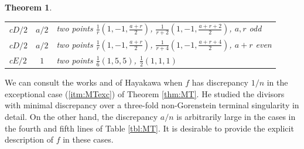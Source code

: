 \documentclass[a4paper,11pt]{amsart}
\newtheorem{theorem}{Theorem}[section]
\theoremstyle{definition}
\theoremstyle{remark}
\numberwithin{equation}{section}
\begin{document}
\begin{theorem}
\begin{enumerate}
\begin{table}[ht]
\begin{tabular}{l|c|l}
\textup{c$D/2$}  & $a/2$ &
\textup{two points $\frac{1}{r}(1,-1,\frac{a+r}{2})$,
$\frac{1}{r+2}(1,-1,\frac{a+r+2}{2})$,
$a,r$ odd} \\[1.5pt]
\textup{c$D/2$}  & $a/2$ &
\textup{two points $\frac{1}{r}(1,-1,\frac{a+r}{2})$,
$\frac{1}{r+4}(1,-1,\frac{a+r+4}{2})$,
$a+r$ even} \\[1.5pt]
\textup{c$E/2$}  & $1$ &
\textup{two points $\frac{1}{6}(1,5,5)$, $\frac{1}{2}(1,1,1)$} \\[1.5pt]
\hline
\end{tabular}
\end{table}
\end{enumerate}
\end{theorem}

We can consult the works \cite{Ha99} and \cite{Ha00} of Hayakawa
when $f$ has discrepancy $1/n$
in the exceptional case (\ref{itm:MTexc}) of Theorem \ref{thm:MT}.
He studied the divisors with minimal discrepancy
over a three-fold non-Gorenstein terminal singularity in detail.
On the other hand,
the discrepancy $a/n$ is arbitrarily large
in the cases in the fourth and fifth lines of Table \ref{tbl:MT}.
It is desirable to provide the explicit description of $f$ in these cases.
\end{document}
